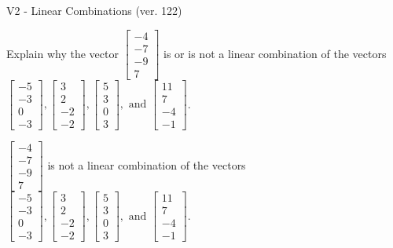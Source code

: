 \begin{exercise}
  \begin{exerciseTitle}V2 - Linear Combinations (ver. 122)\end{exerciseTitle}
  \begin{exerciseStatement}
    Explain why the vector \(\left[\begin{array}{c}
-4 \\
-7 \\
-9 \\
7
\end{array}\right]\)  is or is not a linear 
	combination of the vectors \(\left[\begin{array}{c}
-5 \\
-3 \\
0 \\
-3
\end{array}\right] , \left[\begin{array}{c}
3 \\
2 \\
-2 \\
-2
\end{array}\right] , \left[\begin{array}{c}
5 \\
3 \\
0 \\
3
\end{array}\right] , \text{ and } \left[\begin{array}{c}
11 \\
7 \\
-4 \\
-1
\end{array}\right]\).
	


  \end{exerciseStatement}
  \begin{exerciseAnswer}
   \(\left[\begin{array}{c}
-4 \\
-7 \\
-9 \\
7
\end{array}\right]\) 
  	 is not  
	a linear combination of the vectors \(\left[\begin{array}{c}
-5 \\
-3 \\
0 \\
-3
\end{array}\right] , \left[\begin{array}{c}
3 \\
2 \\
-2 \\
-2
\end{array}\right] , \left[\begin{array}{c}
5 \\
3 \\
0 \\
3
\end{array}\right] , \text{ and } \left[\begin{array}{c}
11 \\
7 \\
-4 \\
-1
\end{array}\right]\).


\end{exerciseAnswer}
\end{exercise}
